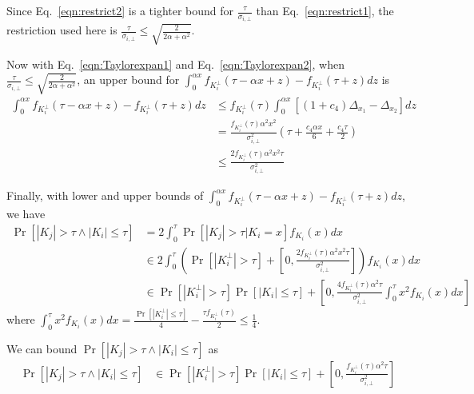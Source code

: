Since Eq.~\ref{eqn:restrict2} is a tighter bound for $\frac{\tau}{\sigma_{i,\bot}}$ than Eq.~\ref{eqn:restrict1}, the restriction used here is $\frac{\tau}{\sigma_{i,\bot}} \leq \sqrt{\frac{2}{2\alpha + \alpha^2}}$.

Now with Eq.~\ref{eqn:Taylorexpan1} and Eq.~\ref{eqn:Taylorexpan2}, when $\frac{\tau}{\sigma_{i,\bot}} \leq \sqrt{\frac{2}{2\alpha + \alpha^2}}$, an upper bound for $\int_0^{\alpha x}f_{K^{\bot}_i}(\tau - \alpha x+z) - f_{K^{\bot}_i}(\tau + z)dz $ is
\begin{equation}
\begin{split}
    \int_0^{\alpha x}f_{K^{\bot}_i}(\tau - \alpha x+z) - f_{K^{\bot}_i}(\tau + z)dz  
    &\leq f_{K^{\bot}_i}(\tau ) \int_0^{\alpha x}  [(1+c_4)\Delta_{x_1} - \Delta_{x_2}]   dz     \\ 
    &= \frac{f_{K^{\bot}_i}(\tau )\alpha^2 x^2}{\sigma^2_{i,\bot}}\left(\tau + \frac{c_4\alpha x}{6} + \frac{c_4 \tau}{2} \right)  \\ 
    &\leq \frac{2f_{K^{\bot}_i}(\tau )\alpha^2 x^2 \tau}{\sigma^2_{i,\bot}}
\end{split}
\end{equation}

Finally, with lower and upper bounds of $\int_0^{\alpha x}f_{K^{\bot}_i}(\tau - \alpha x+z) - f_{K^{\bot}_i}(\tau + z)dz$, we have
\begin{equation} \label{eqn:temp4}
\begin{split}
    \Pr\left[|K_j |>\tau \wedge | K_i | \leq \tau \right]
    &= 2 \int_0^{\tau} \Pr\left[|K_j |>\tau \Big | K_i = x\right]f_{K_i}(x) dx  \\ 
    &\in 2 \int_0^{\tau} \left(\Pr[|K^{\bot}_i| > \tau ] + \left[0, \frac{2f_{K^{\bot}_i}(\tau )\alpha^2 x^2 \tau}{\sigma^2_{i,\bot}}\right] \right)f_{K_i}(x) dx    \\
    &\in \Pr[|K^{\bot}_i| > \tau ]\Pr[|K_i| \leq \tau ] + \left[0, \frac{4f_{K^{\bot}_i}(\tau )\alpha^2 \tau}{\sigma^2_{i,\bot}}\int_0^{\tau}x^2 f_{K_i}(x)dx \right]          
\end{split}
\end{equation}
where $\int_0^{\tau}x^2 f_{K_i}(x)dx 
    = \frac{\Pr[|K^{\bot}_i| \leq \tau ]}{4} -\frac{\tau f_{K^{\bot}_i}(\tau )}{2}
    \leq \frac{1}{4}$.
    
We can bound $\Pr\left[|K_j |>\tau \wedge | K_i | \leq \tau \right]$ as
\begin{equation} \label{eqn:temp4}
\begin{split}
    \Pr\left[|K_j |>\tau \wedge | K_i | \leq \tau \right]
    &\in \Pr[|K^{\bot}_i| > \tau ]\Pr[|K_i| \leq \tau ] + \left[0, \frac{f_{K^{\bot}_i}(\tau )\alpha^2 \tau}{\sigma^2_{i,\bot}} \right]
\end{split}
\end{equation}

